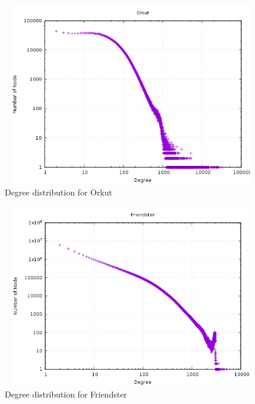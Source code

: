 \documentclass{article}
\begin{document}
\FloatBarrier
\begin{figure}[h!]
  \includegraphics[width=12cm, height=8cm]{orkut.png}
  \caption{Degree distribution for Orkut}
\end{figure}
\FloatBarrier
\begin{figure}[h!]
  \includegraphics[width=12cm, height=8cm]{friendster.png}
  \caption{Degree distribution for Friendster}
\end{figure}
\FloatBarrier
\end{document}
